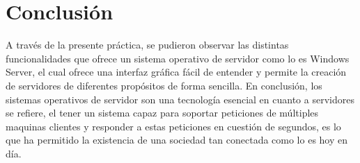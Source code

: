\documentclass[letterpaper,12pt]{article} %
\begin{document}
\newpage



\newpage

\section{Conclusión}
A través de la presente práctica, se pudieron observar las distintas funcionalidades que ofrece un sistema operativo de servidor como lo es Windows Server, el cual ofrece una interfaz gráfica fácil de entender y permite la creación de servidores de diferentes propósitos de forma sencilla. En conclusión, los sistemas operativos de servidor son una tecnología esencial en cuanto a servidores se refiere, el tener un sistema capaz para soportar peticiones de múltiples maquinas clientes y responder a estas peticiones en cuestión de segundos, es lo que ha permitido la existencia de una sociedad tan conectada como lo es hoy en día.



            \nocite{*}
            
            



\centering\vspace*{\fill} 
\end{document}
